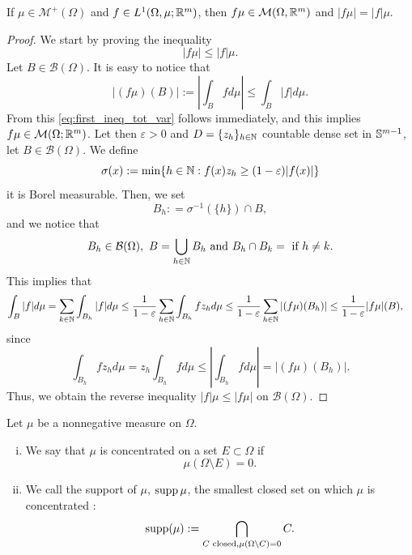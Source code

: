 \begin{lemma}
If $\mu \in \mathcal{M}^+(\Omega)$ and $f\in L^1(\Omega,\mu;\R^m)$, then $f\mu \in \mathcal{M}(\Omega,\R^m)$ and $|f\mu| = |f|\mu$.
\end{lemma}
\begin{proof}
We start by proving the inequality 
\begin{equation} \label{eq:first_ineq_tot_var}
|f\mu| \leq |f| \mu.
\end{equation}
Let $B \in \mathcal{B}(\Omega)$. It is easy to notice that
\begin{equation*}
|(f \mu)(B)| := \left | \int_B f d\mu \right | \leq \int_B |f| d\mu.
\end{equation*} 
From this \eqref{eq:first_ineq_tot_var} follows immediately, and this implies $f\mu \in \mathcal{M}(\Omega;\R^m)$. 
Let then $\varepsilon > 0$ and $D = \{z_h\}_{h\in\N}$ countable dense set in
$\S^{m-1}$, let $B \in \mathcal{B}(\Omega)$. We define 
\[
\sigma(x) := \min \{h\in \N: f(x) z_h \geq (1-\varepsilon)|f(x)|\}
\]
it is Borel measurable. Then, we set $$B_h : = \sigma^{-1}(\{h\}) \cap B,$$ 
and we notice that 
\begin{equation*}
B_{h} \in \mathcal{B}(\Omega), \ B = \bigcup_{h\in\N} B_h \text{ and } B_h \cap B_k = \empty \text{ if } h\neq k. 
\end{equation*}
This implies that 
\[
\begin{aligned}
\int_B |f| d\mu 
&= \sum_{k\in\N} \int_{B_h} |f| d\mu 
\leq \frac{1}{1-\varepsilon} \sum_{h\in\N} \int_{B_h} f z_h d\mu 
\leq \frac{1}{1-\varepsilon} \sum_{h\in\N} |(f \mu)(B_h)|  
\leq \frac{1}{1-\varepsilon}  |f \mu|(B),
\end{aligned}
\]
since 
\[
\int_{B_h} f z_h d\mu 
= z_h \int_{B_h} f d\mu 
\leq \left|\int_{B_h} f d\mu \right|
= |(f \mu)(B_h)|.  
\]
Thus, we obtain the reverse inequality $|f| \mu \le |f \mu|$ on $\mathcal{B}(\Omega)$.
\end{proof}

\begin{definition}
Let $\mu$ be a nonnegative measure on $\Omega$.
\begin{enumerate}[i)]
\item We say that $\mu$ is concentrated on a set $E \subset \Omega$ if  
\[
\mu(\Omega \setminus E) = 0.
\]
\item We call the support of $\mu$, $\supp \mu$, the smallest closed set on
which $\mu$ is concentrated :
\[
\supp (\mu) := \bigcap_{C \text{ closed}, \mu (\Omega\setminus C) = 0} C.
\]
\end{enumerate}
\end{definition}

